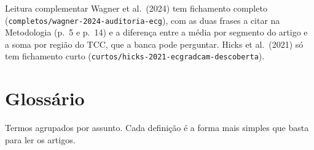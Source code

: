 \documentclass[11pt,a4paper]{article}
\begin{document}
\begin{infobox}[note]{Leitura complementar}
Wagner et al.\ (2024) tem fichamento completo (\texttt{completos/wagner-2024-auditoria-ecg}), com as duas frases a citar na Metodologia (p.~5 e p.~14) e a diferença entre a média por segmento do artigo e a soma por região do TCC, que a banca pode perguntar. Hicks et al.\ (2021) só tem fichamento curto (\texttt{curtos/hicks-2021-ecgradcam-descoberta}).
\end{infobox}

\section{Glossário}\label{sec:glossario}
Termos agrupados por assunto. Cada definição é a forma mais simples que basta para ler os artigos.
\end{document}
